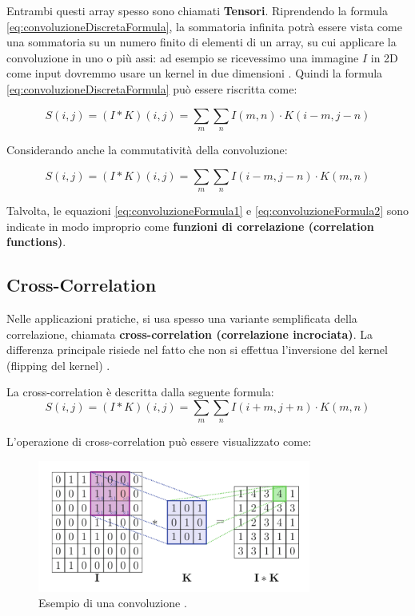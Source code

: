 Entrambi questi array spesso sono chiamati \textbf{Tensori}. Riprendendo la formula \eqref{eq:convoluzioneDiscretaFormula}, la
sommatoria infinita potrà essere vista come una sommatoria su un numero finito di elementi 
di un array, su cui applicare la convoluzione in uno o più assi: ad esempio se
ricevessimo una immagine $I$ in 2D come input dovremmo usare un kernel in due dimensioni 
\cite{ALL_DEEP_LEARNING}.
Quindi la formula \eqref{eq:convoluzioneDiscretaFormula} può essere riscritta come:

\begin{equation}
    S(i,j)=(I*K)(i,j)=\sum_m \sum_n I(m,n)\cdot K(i-m,j-n)
    \label{eq:convoluzioneFormula1}
\end{equation}

Considerando anche la commutatività della convoluzione:

\begin{equation}
    S(i,j)=(I*K)(i,j)=\sum_m \sum_n I(i-m,j-n)\cdot K(m,n)
    \label{eq:convoluzioneFormula2}
\end{equation}



Talvolta, le equazioni \eqref{eq:convoluzioneFormula1} e \eqref{eq:convoluzioneFormula2} 
sono indicate in modo improprio come \textbf{ funzioni di correlazione (correlation functions)}.

\subsection{Cross-Correlation}
Nelle applicazioni pratiche, si usa spesso una variante semplificata della correlazione, 
chiamata \textbf{cross-correlation (correlazione incrociata)}.
La differenza principale risiede nel fatto che non si effettua 
l’inversione del kernel (flipping del kernel) \cite{ALL_DEEP_LEARNING}. 

La cross-correlation è descritta dalla seguente formula:
\begin{equation}
    S(i,j)=(I*K)(i,j)=\sum_m \sum_n I(i+m,j+n)\cdot K(m,n)
    \label{eq:Cross-Correlation}
\end{equation}

L'operazione di cross-correlation può essere visualizzato come:
\begin{figure}[h]
    \centering
    \includegraphics[width=0.8\textwidth]{Immagini/Grafici/convoluzione.png}
    \caption{Esempio di una convoluzione \cite{ELEMENTI_CNN_1,ALL_DEEP_LEARNING}.}
    \label{fig:convoluzione}
\end{figure}

